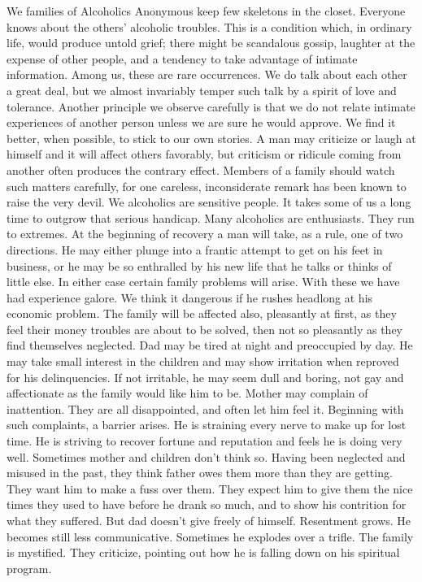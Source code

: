 \begin{biblechapter}
We families of Alcoholics Anonymous keep few skeletons in the closet.  Everyone knows about the others' alcoholic troubles.  This is a condition which, in ordinary life, would produce untold grief; there might be scandalous gossip, laughter at the expense of other people, and a tendency to take advantage of intimate information.  Among us, these are rare occurrences.  We do talk about each other a great deal, but we almost invariably temper such talk by a spirit of love and tolerance.
Another principle we observe carefully is that we do not relate intimate experiences of another person unless we are sure he would approve.  We find it better, when possible, to stick to our own stories.  A man may criticize or laugh at himself and it will affect others favorably, but criticism or ridicule coming from another often produces the contrary effect.  Members of a family should watch such matters carefully, for one careless, inconsiderate remark has been known to raise the very devil.  We alcoholics are sensitive people.  It takes some of us a long time to outgrow that serious handicap.
Many alcoholics are enthusiasts.  They run to extremes.  At the beginning of recovery a man will take, as a rule, one of two directions.  He may either plunge into a frantic attempt to get on his feet in business, or he may be so enthralled by his new life that he talks or thinks of little else.  In either case certain family problems will arise.  With these we have had experience galore.
We think it dangerous if he rushes headlong at his economic problem.  The family will be affected also, pleasantly at first, as they feel their money troubles are about to be solved, then not so pleasantly as they find themselves neglected.  Dad may be tired at night and preoccupied by day.  He may take small interest in the children and may show irritation when reproved for his delinquencies.  If not irritable, he may seem dull and boring, not gay and affectionate as the family would like him to be.  Mother may complain of inattention.  They are all disappointed, and often let him feel it.  Beginning with such complaints, a barrier arises.  He is straining every nerve to make up for lost time.  He is striving to recover fortune and reputation and feels he is doing very well.
Sometimes mother and children don't think so.  Having been neglected and misused in the past, they think father owes them more than they are getting.  They want him to make a fuss over them.  They expect him to give them the nice times they used to have before he drank so much, and to show his contrition for what they suffered.  But dad doesn't give freely of himself.  Resentment grows.  He becomes still less communicative.  Sometimes he explodes over a trifle.  The family is mystified.  They criticize, pointing out how he is falling down on his spiritual program.

\end{biblechapter}
